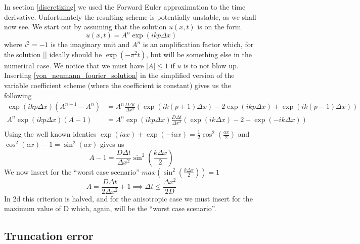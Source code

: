 In section \ref{discretizing} we used the Forward Euler approximation to the time derivative. 
Unfortunately the resulting scheme is potentially unstable, as we shall now see. 
We start out by assuming that the solution $u(x,t)$ is on the form 
\begin{equation}\label{von_neumann_fourier_solution}
 u(x,t) = A^n\exp(ikp\Delta x)
\end{equation}
where $i^2=-1$ is the imaginary unit and $A^n$ is an amplification factor which, for the solution \ref{} ideally should be $\exp(-\pi^2t)$, but will be something else in the numerical case. 
We notice that we must have $\left|A\right|\leq 1$ if $u$ is to not blow up. 
Inserting \ref{von_neumann_fourier_solution} in the simplified version of the variable coefficient scheme (where the coefficient is constant) gives us the following
\begin{align*}
 \exp(ikp\Delta x)\left(A^{n+1}-A^n\right) &= A^n\frac{D\Delta t}{\Delta x^2}\left(\exp(ik(p+1)\Delta x)-2\exp(ikp\Delta x) +\exp(ik(p-1)\Delta x)\right)\\
  A^n\exp(ikp\Delta x)\left(A-1\right) &=  A^n\exp(ikp\Delta x)\frac{D\Delta t}{\Delta x^2}\left(\exp(ik\Delta x) -2 + \exp(-ik\Delta x)\right)\\
\end{align*}
Using the well known identies $\exp(iax)+\exp(-iax) = \frac{1}{2}\cos^2\left(\frac{ax}{2}\right)$  and $\cos^2(ax)-1 = \sin^2(ax)$ gives us
\begin{equation}
 A-1 = \frac{D\Delta t}{\Delta x^2}\sin^2\left(\frac{k\Delta x}{2}\right)
\end{equation}
We now insert for the ``worst case scenario'' $max(\sin^2\left(\frac{k\Delta x}{2}\right))= 1$
\begin{equation}
 A = \frac{D\Delta t}{2\Delta x^2}+1 \implies \Delta t\leq\frac{\Delta x^2}{2D}
\end{equation}
In 2d this criterion is halved, and for the anisotropic case we must insert for the maximum value of D which, again, will be the ``worst case scenario''.



\subsection{Truncation error}\label{truncation_error}

